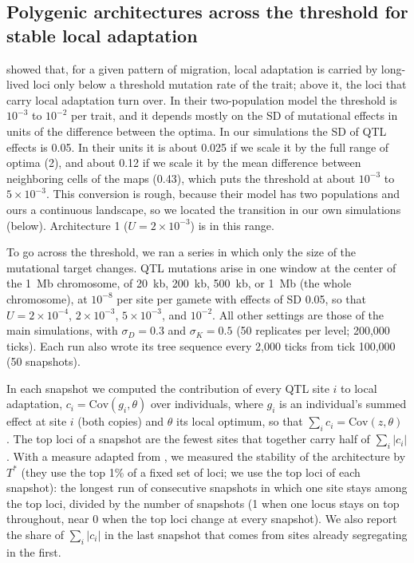 \documentclass[]{article}
\begin{document}
\subsection*{Polygenic architectures across the threshold for stable local adaptation}

\citet{sakamoto_mutation_2024} showed that,
for a given pattern of migration,
local adaptation is carried by long-lived loci
only below a threshold mutation rate of the trait;
above it, the loci that carry local adaptation turn over.
In their two-population model the threshold is
$10^{-3}$ to $10^{-2}$ per trait,
and it depends mostly on the SD of mutational effects
in units of the difference between the optima.
In our simulations the SD of QTL effects is 0.05.
In their units it is about 0.025 if we scale it by the full range of optima (2),
and about 0.12 if we scale it by the mean difference
between neighboring cells of the maps (0.43),
which puts the threshold at about $10^{-3}$ to $5 \times 10^{-3}$.
This conversion is rough,
because their model has two populations and ours a continuous landscape,
so we located the transition in our own simulations (below).
Architecture 1 ($U = 2 \times 10^{-3}$) is in this range.

To go across the threshold,
we ran a series in which only the size of the mutational target changes.
QTL mutations arise in one window at the center of the 1~Mb chromosome,
of 20~kb, 200~kb, 500~kb, or 1~Mb (the whole chromosome),
at $10^{-8}$ per site per gamete with effects of SD 0.05,
so that $U = 2 \times 10^{-4}$, $2 \times 10^{-3}$,
$5 \times 10^{-3}$, and $10^{-2}$.
All other settings are those of the main simulations,
with $\sigma_D = 0.3$ and $\sigma_K = 0.5$
(50 replicates per level; 200,000 ticks).
Each run also wrote its tree sequence every 2,000 ticks
from tick 100,000 (50 snapshots).

In each snapshot we computed the contribution of every QTL site $i$
to local adaptation,
$c_i = \mathrm{Cov}(g_i, \theta)$ over individuals,
where $g_i$ is an individual's summed effect at site $i$ (both copies)
and $\theta$ its local optimum,
so that $\sum_i c_i = \mathrm{Cov}(z, \theta)$ \citep{booker_structure_2024}.
The top loci of a snapshot are the fewest sites
that together carry half of $\sum_i |c_i|$.
With a measure adapted from \citet{sakamoto_mutation_2024},
we measured the stability of the architecture by $T^*$
(they use the top 1\% of a fixed set of loci;
we use the top loci of each snapshot):
the longest run of consecutive snapshots
in which one site stays among the top loci,
divided by the number of snapshots
(1 when one locus stays on top throughout, near 0 when the top loci change at every snapshot).
We also report the share of $\sum_i |c_i|$ in the last snapshot
that comes from sites already segregating in the first.
\end{document}
